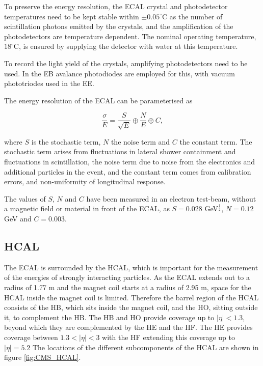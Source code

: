 To preserve the energy resolution, the \ac{ECAL} crystal and
photodetector temperatures need to be kept stable within $\pm 0.05^{\circ}$C
as the number of scintillation photons emitted by the crystals,
and the amplification of the photodetectors are temperature dependent.
The nominal operating temperature, $18^{\circ}$C, is ensured by 
supplying the detector with water at this temperature.

To record the light yield of the crystals, amplifying photodetectors
need to be used. In the \ac{EB} avalance photodiodes are employed
for this, with vacuum phototriodes used in the \ac{EE}.

The energy resolution of the \ac{ECAL} can be parameterised as

\begin{equation}\label{eqn:ecalres}
\frac{\sigma}{E} = \frac{S}{\sqrt{E}}\oplus\frac{N}{E}\oplus C,
\end{equation}

where $S$ is the stochastic term, $N$ the noise term and $C$ the constant term.
The stochastic term arises from fluctuations in lateral shower containment and 
fluctuations in scintillation, the noise term due to noise from the electronics
and additional particles in the event, and the constant term comes
from calibration errors, and non-uniformity of longitudinal response.

The values of $S$, $N$ and $C$ have been measured in an electron
test-beam, without a magnetic field or material in front of the \ac{ECAL}, as 
$S = 0.028$ GeV$^{\frac{1}{2}}$, $N = 0.12$ GeV and $C= 0.003$.



\subsection{\acl{HCAL}}
\label{sec:CMSLHC_CMS_hcal}
The \ac{ECAL} is surrounded by the \ac{HCAL}, which is important for the
measurement of the energies of strongly interacting particles. As
the \ac{ECAL} extends out to a radius of 1.77 m and the magnet coil
starts at a radius of 2.95 m, space for the \ac{HCAL} inside the magnet
coil is limited. Therefore the barrel region of the \ac{HCAL} consists
of the \ac{HB}, which sits inside the magnet coil, and the \ac{HO}, sitting outside it, 
to complement the \ac{HB}. The \ac{HB} and \ac{HO}  provide coverage up to $|\eta|<1.3$, 
beyond which they are complemented by the \ac{HE} and the \ac{HF}. The \ac{HE} provides
coverage between $1.3<|\eta|<3$ with the \ac{HF} extending this coverage up to $|\eta| = 5.2$
The locations of the different subcomponents of the \ac{HCAL} are shown
in figure \ref{fig:CMS_HCAL}.

